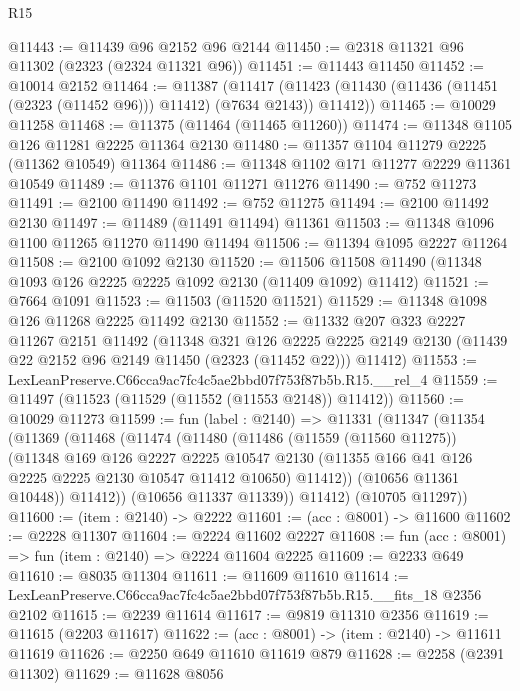 \begin{lexlean}{R15}
\begin{coremodule}
@11443 := @11439 @96 @2152 @96 @2144
@11450 := @2318 @11321 @96 @11302 (@2323 (@2324 @11321 @96))
@11451 := @11443 @11450
@11452 := @10014 @2152
@11464 := @11387
    (@11417 (@11423 (@11430 (@11436 (@11451 (@2323 (@11452 @96))) @11412) (@7634 @2143)) @11412))
@11465 := @10029 @11258
@11468 := @11375 (@11464 (@11465 @11260))
@11474 := @11348 @1105 @126 @11281 @2225 @11364 @2130
@11480 := @11357 @1104 @11279 @2225 (@11362 @10549) @11364
@11486 := @11348 @1102 @171 @11277 @2229 @11361 @10549
@11489 := @11376 @1101 @11271 @11276
@11490 := @752 @11273
@11491 := @2100 @11490
@11492 := @752 @11275
@11494 := @2100 @11492 @2130
@11497 := @11489 (@11491 @11494) @11361
@11503 := @11348 @1096 @1100 @11265 @11270 @11490 @11494
@11506 := @11394 @1095 @2227 @11264
@11508 := @2100 @1092 @2130
@11520 := @11506 @11508 @11490 (@11348 @1093 @126 @2225 @2225 @1092 @2130 (@11409 @1092) @11412)
@11521 := @7664 @1091
@11523 := @11503 (@11520 @11521)
@11529 := @11348 @1098 @126 @11268 @2225 @11492 @2130
@11552 := @11332
    @207
    @323
    @2227
    @11267
    @2151
    @11492
    (@11348
      @321
      @126
      @2225
      @2225
      @2149
      @2130
      (@11439 @22 @2152 @96 @2149 @11450 (@2323 (@11452 @22)))
      @11412)
@11553 := LexLeanPreserve.C66cca9ac7fc4c5ae2bbd07f753f87b5b.R15.__rel_4
@11559 := @11497 (@11523 (@11529 (@11552 (@11553 @2148)) @11412))
@11560 := @10029 @11273
@11599 := fun (label : @2140) =>
  @11331
    (@11347
      (@11354
        (@11369
          (@11468
            (@11474
              (@11480
                (@11486
                  (@11559 (@11560 @11275))
                  (@11348
                    @169
                    @126
                    @2227
                    @2225
                    @10547
                    @2130
                    (@11355 @166 @41 @126 @2225 @2225 @2130 @10547 @11412 @10650)
                    @11412))
                (@10656 @11361 @10448))
              @11412))
          (@10656 @11337 @11339))
        @11412)
      (@10705 @11297))
@11600 := (item : @2140) -> @2222
@11601 := (acc : @8001) -> @11600
@11602 := @2228 @11307
@11604 := @2224 @11602 @2227
@11608 := fun (acc : @8001) => fun (item : @2140) => @2224 @11604 @2225
@11609 := @2233 @649
@11610 := @8035 @11304
@11611 := @11609 @11610
@11614 := LexLeanPreserve.C66cca9ac7fc4c5ae2bbd07f753f87b5b.R15.__fits_18 @2356 @2102
@11615 := @2239 @11614
@11617 := @9819 @11310 @2356
@11619 := @11615 (@2203 @11617)
@11622 := (acc : @8001) -> (item : @2140) -> @11611 @11619
@11626 := @2250 @649 @11610 @11619 @879
@11628 := @2258 (@2391 @11302)
@11629 := @11628 @8056

\end{coremodule}
\end{lexlean}
